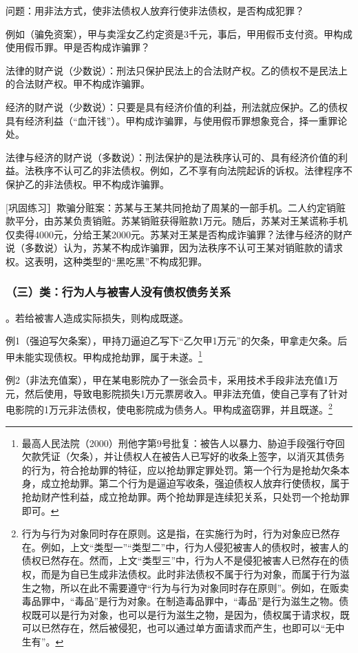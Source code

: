 问题：用非法方式，使非法债权人放弃行使非法债权，是否构成犯罪？

例如（骗免资案），甲与卖淫女乙约定资是3千元，事后，甲用假币支付资。甲构成使用假币罪。甲是否构成诈骗罪？

法律的财产说（少数说）：刑法只保护民法上的合法财产权。乙的债权不是民法上的合法财产权。甲不构成诈骗罪。

经济的财产说（少数说）：只要是具有经济价值的利益，刑法就应保护。乙的债权具有经济利益（“血汗钱”）。甲构成诈骗罪，与使用假币罪想象竞合，择一重罪论处。

法律与经济的财产说（多数说）：刑法保护的是法秩序认可的、具有经济价值的利益。法秩序不认可乙的非法债权。例如，乙不享有向法院起诉的诉权。法律程序不保护乙的非法债权。甲不构成诈骗罪。

[巩固练习］欺骗分赃案：苏某与王某共同抢劫了周某的一部手机。二人约定销赃款平分，由苏某负责销赃。苏某销赃获得赃款1万元。随后，苏某对王某谎称手机仅卖得4000元，分给王某2000元。苏某对王某是否构成诈骗罪？法律与经济的财产说（多数说）认为，苏某不构成诈骗罪，因为法秩序不认可王某对销赃款的请求权。这表明，这种类型的“黑吃黑”不构成犯罪。

\subsubsection*{（三）类：行为人与被害人没有债权债务关系}

。若给被害人造成实际损失，则构成既遂。

例1（强迫写欠条案），甲持刀逼迫乙写下“乙欠甲1万元”的欠条，甲拿走欠条。后甲未能实现债权。甲构成抢劫罪，属于未遂。\footnote{最高人民法院（2000）刑他字第9号批复：被告人以暴力、胁迫手段强行夺回欠款凭证（欠条），并让债权人在被告人已写好的收条上签字，以消灭其债务的行为，符合抢劫罪的特征，应以抢劫罪定罪处罚。第一个行为是抢劫欠条本身，成立抢劫罪。第二个行为是逼迫写收条，强迫债权人放弃行使债权，属于抢劫财产性利益，成立抢劫罪。两个抢劫罪是连续犯关系，只处罚一个抢劫罪即可。}

例2（非法充值案），甲在某电影院办了一张会员卡，采用技术手段非法充值1万元，然后使用，导致电影院损失1万元票房收入。甲非法充值，使自己享有了针对电影院的1万元非法债权，使电影院成为债务人。甲构成盗窃罪，并且既遂。\footnote{行为与行为对象同时存在原则。这是指，在实施行为时，行为对象应已然存在。例如，上文“类型一”“类型二”中，行为人侵犯被害人的债权时，被害人的债权已然存在。然而，上文“类型三”中，行为人不是侵犯被害人已然存在的债权，而是为自已生成非法债权。此时非法债权不属于行为对象，而属于行为滋生之物，所以在此不需要遵守“行为与行为对象同时存在原则”。例如，在贩卖毒品罪中，“毒品”是行为对象。在制造毒品罪中，“毒品”是行为滋生之物。债权既可以是行为对象，也可以是行为滋生之物，是因为，债权属于请求权，既可以已然存在，然后被侵犯，也可以通过单方面请求而产生，也即可以“无中生有”。}


